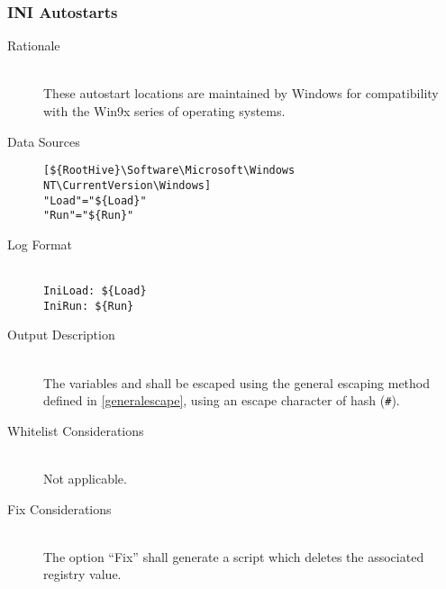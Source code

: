 \subsubsection{INI Autostarts}
\begin{description}
\item[Rationale] \hfill \\
These autostart locations are maintained by Windows for compatibility with the
Win9x series of operating systems.
\item[Data Sources] \hfill
\vspace{-\baselineskip}
\begin{verbatim}
[${RootHive}\Software\Microsoft\Windows NT\CurrentVersion\Windows]
"Load"="${Load}"
"Run"="${Run}"
\end{verbatim}
\item[Log Format] \hfill \\
\verb|IniLoad: ${Load}| \\
\verb|IniRun: ${Run}|
\item[Output Description] \hfill \\
The variables  and  shall be escaped using the general
escaping method defined in \ref{generalescape}, using an escape character of
hash (\verb|#|).
\item[Whitelist Considerations] \hfill \\
Not applicable.
\item[Fix Considerations] \hfill \\
The option ``Fix'' shall generate a script which deletes the associated
registry value.
\end{description}

